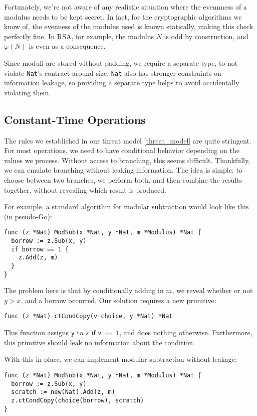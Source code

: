 \documentclass[11pt, a4paper]{article} %
\begin{document}
{Fortunately, we're not
aware of any realistic situation where the evennness of a
modulus needs to be kept secret. In fact, for the cryptographic
algorithms we know of, the evenness of the modulus used
is known statically, making this check perfectly fine.
In RSA, for example, the modulus $N$ is odd by construction, and
$\varphi(N)$ is even as a consequence.

Since moduli are stored without padding, we require a separate
type, to not violate \texttt{Nat}'s contract around size.
\texttt{Nat} also has stronger constraints on information leakage,
so providing a separate type helps to avoid accidentally
violating them.

\subsection{Constant-Time Operations}

The rules we established in our threat model \ref{threat_model}
are quite stringent. For most operations, we need to have conditional
behavior depending on the values we process. Without access
to branching, this seems difficult.
Thankfully, we can emulate branching
without leaking information.
The idea is simple: to choose between two branches, we perform both,
and then combine
the results together, without revealing
which result is produced.

For example, a standard algorithm for modular subtraction would look
like this (in pseudo-Go):

\begin{verbatim}
func (z *Nat) ModSub(x *Nat, y *Nat, m *Modulus) *Nat {
  borrow := z.Sub(x, y)
  if borrow == 1 {
    z.Add(z, m)
  }
}
\end{verbatim}

The problem here is that by conditionally adding in $m$, we reveal
whether or not $y > x$, and a borrow occurred. Our solution
requires a new primitive:

\begin{verbatim}
func (z *Nat) ctCondCopy(v choice, y *Nat) *Nat
\end{verbatim}

This function assigns \texttt{y} to \texttt{z} if
\texttt{v == 1}, and does nothing otherwise.
Furthermore, this primitive should leak no information about
the condition.

With this in place, we can implement modular subtraction without leakage:

\begin{verbatim}
func (z *Nat) ModSub(x *Nat, y *Nat, m *Modulus) *Nat {
  borrow := z.Sub(x, y)
  scratch := new(Nat).Add(z, m)
  z.ctCondCopy(choice(borrow), scratch)
}
\end{verbatim}

}
\end{document}
